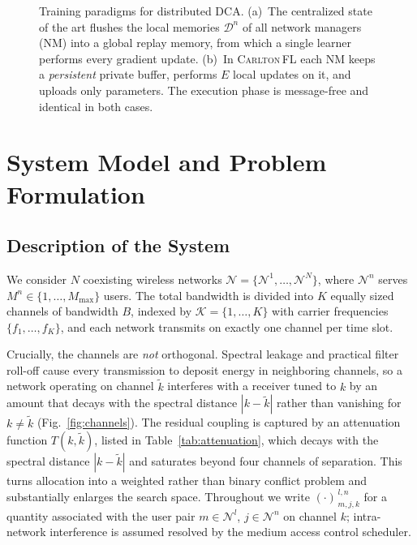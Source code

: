 \documentclass[journal]{IEEEtran}
\newcommand{\OURS}{\textsc{Carlton\,FL}}
\newcommand{\FedProx}{\textsc{FedProx}}
\begin{document}
\begin{figure}[!t]
{}
\caption{Training paradigms for distributed DCA. (a)~The centralized state of
the art flushes the local memories $\mathcal{D}^{n}$ of all network managers
(NM) into a global replay memory, from which a single learner performs every
gradient update. (b)~In \OURS{} each NM keeps a \emph{persistent} private
buffer, performs $E$ local updates on it, and uploads only parameters. The
execution phase is message-free and identical in both cases.}
\label{fig:paradigms}
\end{figure}

\section{System Model and Problem Formulation}
\label{sec:model}

\subsection{Description of the System}
\label{subsec:model_system}

We consider $N$ coexisting wireless networks
$\mathcal{N}=\{\mathcal{N}^{1},\dots,\mathcal{N}^{N}\}$, where
$\mathcal{N}^{n}$ serves $M^{n}\in\{1,\dots,M_{\max}\}$ users. The total
bandwidth is divided into $K$ equally sized channels of bandwidth $B$, indexed
by $\mathcal{K}=\{1,\dots,K\}$ with carrier frequencies $\{f_{1},\dots,f_{K}\}$,
and each network transmits on exactly one channel per time slot.

Crucially, the channels are \emph{not} orthogonal. Spectral leakage and
practical filter roll-off cause every transmission to deposit energy in
neighboring channels, so a network operating on channel $\tilde{k}$ interferes
with a receiver tuned to $k$ by an amount that decays with the spectral
distance $|k-\tilde{k}|$ rather than vanishing for $k\neq\tilde{k}$
(Fig.~\ref{fig:channels}). The residual coupling is captured by an attenuation
function $T(k,\tilde{k})$, listed in Table~\ref{tab:attenuation}, which decays
with the spectral distance $|k-\tilde{k}|$ and saturates beyond four channels
of separation. This turns allocation into a
weighted rather than binary conflict problem and substantially enlarges the
search space. Throughout we write $(\cdot)^{\,l,n}_{\,m,j,k}$ for a quantity
associated with the user pair $m\in\mathcal{N}^{l}$, $j\in\mathcal{N}^{n}$ on
channel $k$; intra-network interference is assumed resolved by the medium
access control scheduler.
\end{document}
